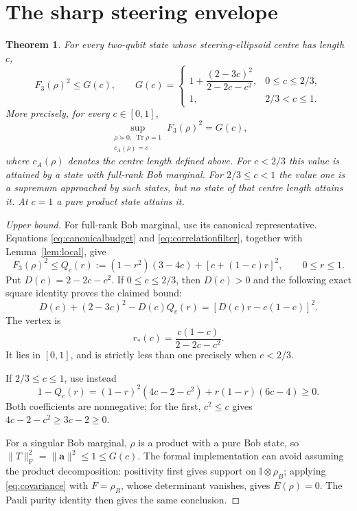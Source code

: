\documentclass[11pt]{article}
\newtheorem{theorem}{Theorem}
\newcommand{\tr}{\operatorname{Tr}}
\newcommand{\Id}{\mathbb{I}}
\newcommand{\norm}[1]{\lVert #1\rVert}
\begin{document}
\section{The sharp steering envelope}
\begin{theorem}\label{thm:main}
For every two-qubit state whose steering-ellipsoid centre has length $c$,
\[
 F_3(\rho)^2\leq G(c),\qquad
 G(c)=\begin{cases}
 1+\dfrac{(2-3c)^2}{2-2c-c^2},&0\leq c\leq2/3,\\[5pt]
 1,&2/3<c\leq1.
 \end{cases}
\]
More precisely, for every $c\in[0,1]$,
\[
 \sup_{\substack{\rho\succeq0,\ \tr\rho=1\\c_A(\rho)=c}} F_3(\rho)^2=G(c),
\]
where $c_A(\rho)$ denotes the centre length defined above. For $c<2/3$ this value is attained by a state with full-rank Bob marginal. For $2/3\leq c<1$ the value one is a supremum approached by such states, but no state of that centre length attains it. At $c=1$ a pure product state attains it.
\end{theorem}
\begin{proof}[Upper bound]
For full-rank Bob marginal, use its canonical representative. Equations \eqref{eq:canonicalbudget} and \eqref{eq:correlationfilter}, together with Lemma~\ref{lem:local}, give
\begin{equation}\label{eq:quadratic}
 F_3(\rho)^2\leq Q_c(r):=(1-r^2)(3-4c)+[c+(1-c)r]^2,
 \qquad 0\leq r\leq1.
\end{equation}
Put $D(c)=2-2c-c^2$. If $0\leq c\leq2/3$, then $D(c)>0$ and the following exact square identity proves the claimed bound:
\[
 D(c)+(2-3c)^2-D(c)Q_c(r)
   =[D(c)r-c(1-c)]^2.
\]
The vertex is
\begin{equation}\label{eq:vertex}
 r_*(c)=\frac{c(1-c)}{2-2c-c^2}.
\end{equation}
It lies in $[0,1]$, and is strictly less than one precisely when $c<2/3$.

If $2/3\leq c\leq1$, use instead
\[
 1-Q_c(r)=(1-r)^2(4c-2-c^2)+r(1-r)(6c-4)\geq0.
\]
Both coefficients are nonnegative; for the first, $c^2\leq c$ gives $4c-2-c^2\geq3c-2\geq0$.

For a singular Bob marginal, $\rho$ is a product with a pure Bob state, so $\norm T_{\mathrm F}^2=\norm{\mathbf a}^2\leq1\leq G(c)$. The formal implementation can avoid assuming the product decomposition: positivity first gives support on $\Id\otimes\rho_B$; applying \eqref{eq:covariance} with $F=\rho_B$, whose determinant vanishes, gives $E(\rho)=0$. The Pauli purity identity then gives the same conclusion.
\end{proof}
\end{document}
